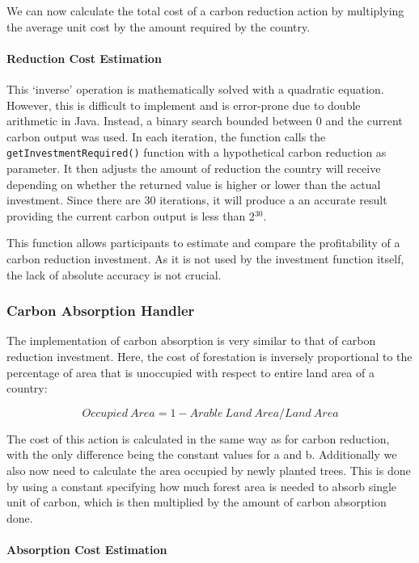We can now calculate the total cost of a carbon reduction action by multiplying the average unit cost by the amount required by the country.

\paragraph{Reduction Cost Estimation}

This `inverse' operation is mathematically solved with a quadratic equation. However, this is difficult to implement and is error-prone due to double arithmetic in Java. Instead, a binary search bounded between 0 and the current carbon output was used. In each iteration, the function calls the \texttt{getInvestmentRequired()} function with a hypothetical carbon reduction as parameter. It then adjusts the amount of reduction the country will receive depending on whether the returned value is higher or lower than the actual investment. Since there are 30 iterations, it will produce a an accurate result providing the current carbon output is less than 2$^{30}$.
  
This function allows participants to estimate and compare the profitability of a carbon reduction investment. As it is not used by the investment function itself, the lack of absolute accuracy is not crucial.

\subsubsection{Carbon Absorption Handler}

The implementation of carbon absorption is very similar to that of carbon reduction investment. Here, the cost of forestation is inversely proportional to the percentage of area that is unoccupied with respect to entire land area of a country:

$$
Occupied~Area= 1 - Arable~Land~Area / Land~Area
$$

The cost of this action is calculated in the same way as for carbon reduction, with the only difference being the constant values for a and b. Additionally we also now need to calculate the area occupied by newly planted trees. This is done by using a constant specifying how much forest area is needed to absorb single unit of carbon, which is then multiplied by the amount of carbon absorption done.

\paragraph{Absorption Cost Estimation}

